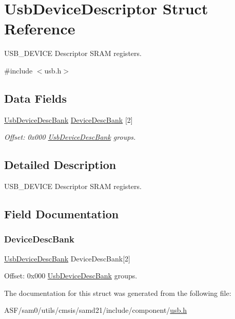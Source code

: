 \hypertarget{struct_usb_device_descriptor}{}\section{Usb\+Device\+Descriptor Struct Reference}
\label{struct_usb_device_descriptor}


U\+S\+B\+\_\+\+D\+E\+V\+I\+CE Descriptor S\+R\+AM registers.  




{\ttfamily \#include $<$usb.\+h$>$}

\subsection*{Data Fields}
\begin{DoxyCompactItemize}
\item 
\mbox{\hyperlink{struct_usb_device_desc_bank}{Usb\+Device\+Desc\+Bank}} \mbox{\hyperlink{struct_usb_device_descriptor_a3aea4cc7fa85f6c896faeddaf009e2e7}{Device\+Desc\+Bank}} \mbox{[}2\mbox{]}
\begin{DoxyCompactList}\small\item\em Offset\+: 0x000 \mbox{\hyperlink{struct_usb_device_desc_bank}{Usb\+Device\+Desc\+Bank}} groups. \end{DoxyCompactList}\end{DoxyCompactItemize}


\subsection{Detailed Description}
U\+S\+B\+\_\+\+D\+E\+V\+I\+CE Descriptor S\+R\+AM registers. 

\subsection{Field Documentation}
\mbox{\label{struct_usb_device_descriptor_a3aea4cc7fa85f6c896faeddaf009e2e7}} 
\subsubsection{\texorpdfstring{DeviceDescBank}{DeviceDescBank}}
{\footnotesize\ttfamily \mbox{\hyperlink{struct_usb_device_desc_bank}{Usb\+Device\+Desc\+Bank}} Device\+Desc\+Bank\mbox{[}2\mbox{]}}



Offset\+: 0x000 \mbox{\hyperlink{struct_usb_device_desc_bank}{Usb\+Device\+Desc\+Bank}} groups. 



The documentation for this struct was generated from the following file\+:\begin{DoxyCompactItemize}
\item 
A\+S\+F/sam0/utils/cmsis/samd21/include/component/\mbox{\hyperlink{component_2usb_8h}{usb.\+h}}\end{DoxyCompactItemize}
